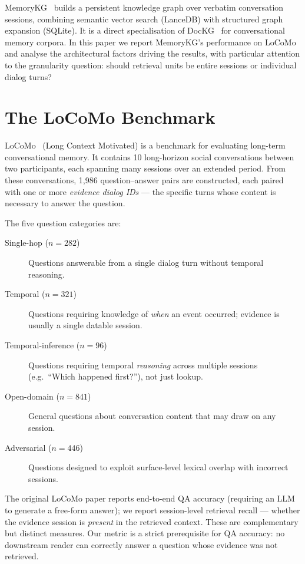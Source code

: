 \documentclass[11pt,a4paper]{article}
\begin{document}
MemoryKG~\citep{memorykg2026} builds a persistent knowledge graph over
verbatim conversation sessions, combining semantic vector search (LanceDB)
with structured graph expansion (SQLite).
It is a direct specialisation of DocKG~\citep{dockg2026} for conversational
memory corpora.
In this paper we report MemoryKG's performance on LoCoMo and analyse the
architectural factors driving the results, with particular attention to
the granularity question: should retrieval units be entire sessions or
individual dialog turns?

\section{The LoCoMo Benchmark}
\label{sec:benchmark}

LoCoMo~\citep{maharana2024locomo} (Long Context Motivated) is a benchmark
for evaluating long-term conversational memory.
It contains 10 long-horizon social conversations between two participants,
each spanning many sessions over an extended period.
From these conversations, 1,986 question--answer pairs are constructed,
each paired with one or more \emph{evidence dialog IDs} --- the specific
turns whose content is necessary to answer the question.

The five question categories are:

\begin{description}
  \item[Single-hop ($n{=}282$)] Questions answerable from a single dialog turn
        without temporal reasoning.
  \item[Temporal ($n{=}321$)] Questions requiring knowledge of \emph{when}
        an event occurred; evidence is usually a single datable session.
  \item[Temporal-inference ($n{=}96$)] Questions requiring temporal
        \emph{reasoning} across multiple sessions (e.g.\ ``Which happened
        first?''), not just lookup.
  \item[Open-domain ($n{=}841$)] General questions about conversation content
        that may draw on any session.
  \item[Adversarial ($n{=}446$)] Questions designed to exploit surface-level
        lexical overlap with incorrect sessions.
\end{description}

The original LoCoMo paper reports end-to-end QA accuracy (requiring an LLM
to generate a free-form answer); we report session-level retrieval recall ---
whether the evidence session is \emph{present} in the retrieved context.
These are complementary but distinct measures.
Our metric is a strict prerequisite for QA accuracy: no downstream reader
can correctly answer a question whose evidence was not retrieved.
\end{document}
